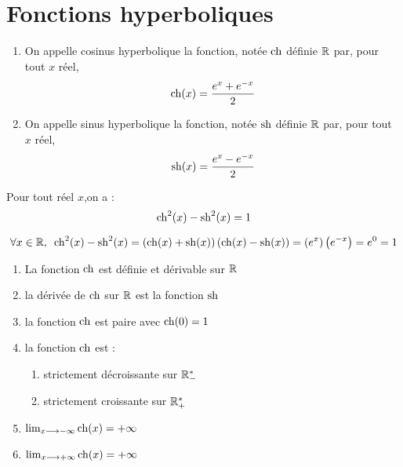 \section{Fonctions hyperboliques}
\begin{defprop}
    \begin{enumerate}
        \item On appelle cosinus hyperbolique la fonction, notée \(\operatorname{ch}\) définie \(\mathbb{R}\) par, pour tout \(x\) réel, 
        \[\operatorname{ch}(x) = \frac{e^x+e^{-x}}{2}\]
        \item On appelle sinus hyperbolique la fonction, notée \(\operatorname{sh}\) définie \(\mathbb{R}\) par, pour tout \(x\) réel, 
        \[\operatorname{sh}(x) = \frac{e^x-e^{-x}}{2}\]
    \end{enumerate}
\end{defprop}

\begin{defprop}
    Pour tout réel \(x\),on a : \[\operatorname{ch}^2(x)-\operatorname{sh}^2(x) = 1\]
\end{defprop}

\begin{dem}
\[\quantifs{\forall x \in \R} \ch^2(x)-\sh^2(x) = \paren{\ch(x)+\sh(x)}\paren{\ch(x)-\sh(x)} = \paren{e^x}\paren{e^{-x}} = e^0 = 1 \]   
\end{dem}

\begin{defprop}
    \begin{enumerate}
        \item La fonction \(\operatorname{ch}\) est définie et dérivable sur \(\mathbb{R}\)
        \item la dérivée de \(\operatorname{ch}\) sur \(\mathbb{R}\) est la fonction \(\operatorname{sh}\)
        \item la fonction \(\operatorname{ch}\) est paire avec \(\operatorname{ch}(0) =1\)
        \item la fonction \(\operatorname{ch}\) est : 
        \begin{enumerate}
            \item strictement décroissante sur \(\mathbb{R}_-^*\)
            \item strictement croissante sur \(\mathbb{R}_+^*\)
        \end{enumerate}
        \item \(\lim_{x\longrightarrow-\infty} \operatorname{ch}(x) = +\infty \)
        \item \(\lim_{x\longrightarrow+\infty} \operatorname{ch}(x) = +\infty \)
    \end{enumerate}    
\end{defprop}

